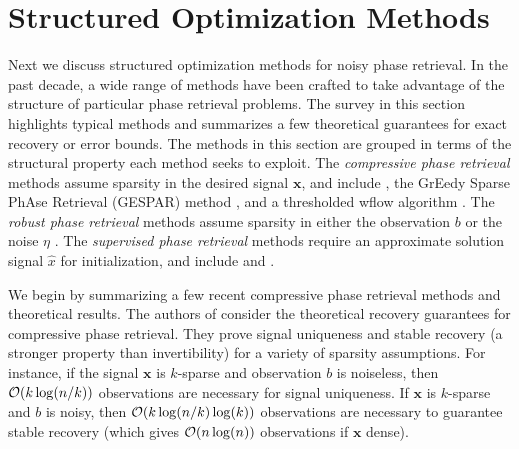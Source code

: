 \section{Structured Optimization Methods}  	\label{Subsubsec:phase_retrieval-structured}


Next we discuss structured optimization methods for noisy phase retrieval.  In the past decade, a wide range of methods have been crafted to take advantage of the structure of particular phase retrieval problems.  The survey in this section highlights typical methods and summarizes a few theoretical guarantees for exact recovery or error bounds.  
The methods in this section are grouped in terms of the structural property each method seeks to exploit.  
The \textit{compressive phase retrieval} methods assume sparsity in the desired signal $\mathbf{x}$, and include \cite{DBLP:journals/corr/abs-1104-4406}, the GrEedy Sparse PhAse Retrieval (GESPAR) method \cite{shechtman2014gespar}, and a thresholded wflow algorithm \cite{cai2016optimal}.
The \textit{robust phase retrieval} methods assume sparsity in either the observation $b$ \cite{katkovnik2017phase} or the noise $\eta$ \cite{jiang2017robust}.
The \textit{supervised phase retrieval} methods require an approximate solution signal $\hat{x}$ for initialization, and include \cite{goldstein2018phasemax} and \cite{bahmani2016phase}.



We begin by summarizing a few recent compressive phase retrieval methods and theoretical results.
The authors of \cite{DBLP:journals/corr/abs-1211-0872} consider the theoretical recovery guarantees for compressive phase retrieval.
They prove signal uniqueness and stable recovery (a stronger property than invertibility) for a variety of sparsity assumptions.  
For instance, if the signal $\mathbf{x}$ is $k$-sparse and observation $b$ is noiseless, then ${\mathcal O}(k \log(n/k))$ observations are necessary for signal uniqueness.  
If $\mathbf{x}$ is $k$-sparse and $b$ is noisy, then ${\mathcal O}(k \log(n/k) \log(k))$ observations are necessary to guarantee stable recovery (which gives ${\mathcal O}(n \log(n))$ observations if $\mathbf{x}$ dense).


